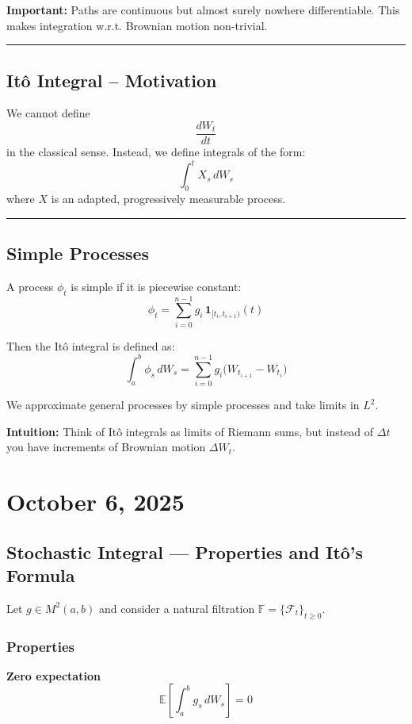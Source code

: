 \documentclass[12pt,a4paper]{article}
\theoremstyle{definition}
\begin{document}
\textbf{Important:} Paths are continuous but almost surely nowhere differentiable. This makes integration w.r.t. Brownian motion non-trivial.

\rule{\textwidth}{0.4pt}

\subsection{Itô Integral – Motivation}

We cannot define
\[
\frac{dW_t}{dt}
\]
in the classical sense. Instead, we define integrals of the form:
\[
\int_0^t X_s \, dW_s
\]
where $X$ is an adapted, progressively measurable process.

\rule{\textwidth}{0.4pt}

\subsection{Simple Processes}

A process $\phi_t$ is simple if it is piecewise constant:
\[
\phi_t = \sum_{i=0}^{n-1} g_i \, \mathbf{1}_{[t_i, t_{i+1})}(t)
\]

Then the Itô integral is defined as:
\[
\int_a^b \phi_s \, dW_s = \sum_{i=0}^{n-1} g_i \big(W_{t_{i+1}} - W_{t_i}\big)
\]

We approximate general processes by simple processes and take limits in $L^2$.

\textbf{Intuition:} Think of Itô integrals as limits of Riemann sums, but instead of $\Delta t$ you have increments of Brownian motion $\Delta W_t$.

\newpage
\section{October 6, 2025}

\subsection{Stochastic Integral — Properties and Itô's Formula}

Let $g \in M^2(a,b)$ and consider a natural filtration $\mathbb{F} = \{\mathcal{F}_t\}_{t \geq 0}$.

\subsubsection{Properties}

\textbf{Zero expectation}
\[
\mathbb{E}\left[\int_a^b g_s \, dW_s\right] = 0
\]
\end{document}
